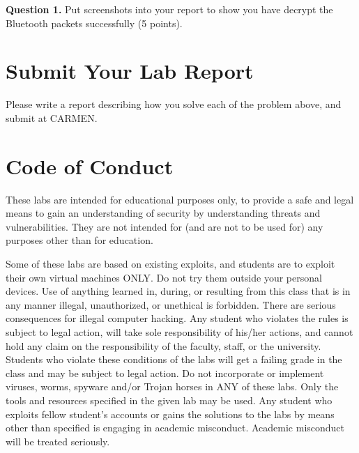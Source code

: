 \documentclass[11pt]{article}
\begin{document}
\begin{enumerate}
 

\textbf{Question 1.} Put screenshots into your report to show you have decrypt the Bluetooth packets successfully (5 points). 
\end{enumerate}  


\section{Submit Your Lab Report}
\label{deliver}
Please write a report describing how you solve each of the problem above, and submit at CARMEN.

\section{Code of Conduct}

These labs are intended for educational purposes only, to provide a safe and legal means to gain an understanding of security by understanding threats and vulnerabilities. They are not intended for (and are not to be used for) any purposes other than for education. 

Some of these labs are based on existing exploits, and students are to exploit their own virtual machines ONLY. Do not try them outside your personal devices. Use of anything learned in, during, or resulting from this class that is in any manner illegal, unauthorized, or unethical is forbidden. There are serious consequences for illegal computer hacking. Any student who violates the rules is subject to legal action, will take sole responsibility of his/her actions, and cannot hold any claim on the responsibility of the faculty, staff, or the university. Students who violate these conditions of the labs will get a failing grade in the class and may be subject to legal action. 
Do not incorporate or implement viruses, worms, spyware and/or Trojan horses in ANY of these labs. Only the tools and resources specified in the given lab may be used. Any student who exploits fellow student's accounts or gains the solutions to the labs by means other than specified is engaging in academic misconduct. Academic misconduct will be treated seriously. 
  
\end{document}
